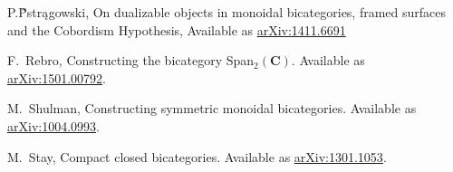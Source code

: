 \documentclass[11pt]{amsart}
\newcommand{\cat}[1]{\mathbf{#1}}
\theoremstyle{remark}
\theoremstyle{definition}
\begin{document}
\begin{thebibliography}{100}
P.\~Pstrągowski,
On dualizable objects in monoidal bicategories, framed surfaces and the Cobordism Hypothesis, 
Available as \href{https://arxiv.org/abs/1411.6691}{arXiv:1411.6691}

F.\ Rebro, 
Constructing the bicategory Span$_{2}(\cat{C})$. 
Available as \href{https://arxiv.org/abs/1501.00792}{arXiv:1501.00792}.

M.\ Shulman, 
Constructing symmetric monoidal bicategories. 
Available as \href{http://arxiv.org/abs/1004.0993}{arXiv:1004.0993}.

 M.\ Stay, 
Compact closed bicategories. 
Available as \href{http://arxiv.org/abs/1301.1053}{arXiv:1301.1053}.

\end{thebibliography}


%
%
\end{document}
